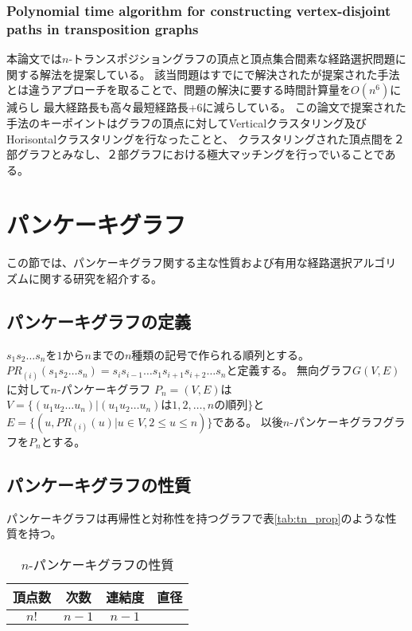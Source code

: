 \documentclass[11pt,a4j]{jsarticle}
\theoremstyle{plain}
\begin{document}
\subsubsection{Polynomial time algorithm for constructing vertex-disjoint paths in transposition graphs}
本論文\cite{tp-n2s2}では$n$-トランスポジショングラフの頂点と頂点集合間素な経路選択問題に関する解法を提案している。
該当問題はすでに\cite{tp-n2n}で解決されたが提案された手法とは違うアプローチを取ることで、問題の解決に要する時間計算量を$O(n^6)$に減らし
最大経路長も高々最短経路長+6に減らしている。\newline
この論文で提案された手法のキーポイントはグラフの頂点に対してVerticalクラスタリング及びHorisontalクラスタリングを行なったことと、
クラスタリングされた頂点間を２部グラフとみなし、２部グラフにおける極大マッチングを行っでいることである。

\section{パンケーキグラフ}
この節では、パンケーキグラフ関する主な性質および有用な経路選択アルゴリズムに関する研究を紹介する。


\subsection{パンケーキグラフの定義}
$s_1s_2\dots s_n$を$1$から$n$までの$n$種類の記号で作られる順列とする。$PR_{(i)}(s_1s_2\dots s_n)=s_is_{i-1}\dots s_1s_{i+1}s_{i+2}\dots s_n$と定義する。
無向グラフ$G(V,E)$に対して$n$-パンケーキグラフ $P_n=(V,E)$は$V=\{(u_1u_2\dots u_n)|(u_1u_2\dots u_n)は1,2,\dots ,nの順列\}$と$E=\{(u,PR_{(i)}(u) | u \in V, 2 \leq u \leq n)\}$である。
以後$n$-パンケーキグラフグラフを$P_n$とする。

\subsection{パンケーキグラフの性質}
パンケーキグラフは再帰性と対称性を持つグラフで表\ref{tab:tn_prop}のような性質を持つ。
\begin{table}[httpb]
  \begin{center}
    \caption{$n$-パンケーキグラフの性質}
    \begin{tabular}{|c|c|c|c|} \hline
      頂点数&次数&連結度&直径 \\ \hline 
      $n!$ & $n-1$&$n-1$& $$\\ \hline
    \end{tabular}
        \label{tab:pn_prop}
  \end{center}
\end{table}
\end{document}
